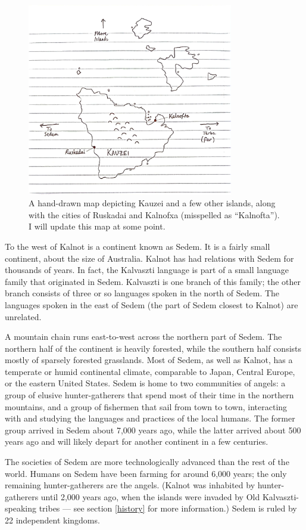 \documentclass{article}
\begin{document}
\begin{figure}[h]
  \centering
  \includegraphics[width=9cm]{kauzei}
  \caption{A hand-drawn map depicting Kauzei and a few other islands, along with the cities of Ruskadai and Kalnofxa (misspelled as ``Kalnofta''). I will update this map at some point.}
\end{figure}

To the west of Kalnot is a continent known as Sedem. It is a fairly small continent, about the size of Australia. Kalnot has had relations with Sedem for thousands of years. In fact, the Kalvaszti language is part of a small language family that originated in Sedem. Kalvaszti is one branch of this family; the other branch consists of three or so languages spoken in the north of Sedem. The languages spoken in the east of Sedem (the part of Sedem closest to Kalnot) are unrelated.

A mountain chain runs east-to-west across the northern part of Sedem. The northern half of the continent is heavily forested, while the southern half consists mostly of sparsely forested grasslands. Most of Sedem, as well as Kalnot, has a temperate or humid continental climate, comparable to Japan, Central Europe, or the eastern United States. Sedem is home to two communities of angels: a group of elusive hunter-gatherers that spend most of their time in the northern mountains, and a group of fishermen that sail from town to town, interacting with and studying the languages and practices of the local humans. The former group arrived in Sedem about 7,000 years ago, while the latter arrived about 500 years ago and will likely depart for another continent in a few centuries.

The societies of Sedem are more technologically advanced than the rest of the world. Humans on Sedem have been farming for around 6,000 years; the only remaining hunter-gatherers are the angels. (Kalnot was inhabited by hunter-gatherers until 2,000 years ago, when the islands were invaded by Old Kalvaszti-speaking tribes --- see section \ref{history} for more information.) Sedem is ruled by 22 independent kingdoms.
\end{document}
